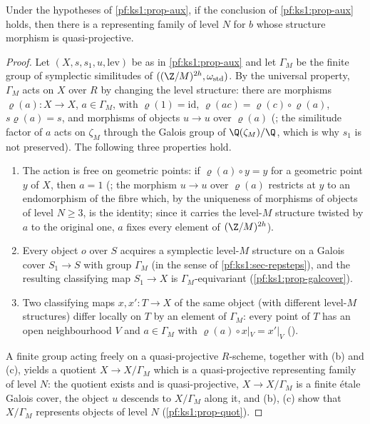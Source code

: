 \begin{proposition}\label{pf:ks1:prop-descent}
Under the hypotheses of \cref{pf:ks1:prop-aux}, if the conclusion of \cref{pf:ks1:prop-aux} holds, then
there is a representing family of level $N$ for $b$ whose structure morphism is quasi-projective.
\end{proposition}

\begin{proof}
Let $(X,s,s_1,u,\mathrm{lev})$ be as in \cref{pf:ks1:prop-aux} and let $\Gamma_M$ be the finite group of
symplectic similitudes of $((\Z/M)^{2h},\omega_{\mathrm{std}})$. By the universal property, $\Gamma_M$ acts on
$X$ over $R$ by changing the level structure: there are morphisms $\varrho(a):X\to X$, $a\in\Gamma_M$, with
$\varrho(1)=\mathrm{id}$, $\varrho(ac)=\varrho(c)\circ\varrho(a)$, $s\varrho(a)=s$, and morphisms of objects $u\to u$ over
$\varrho(a)$ (; the similitude
factor of $a$ acts on $\zeta_M$ through the Galois group of $\Q(\zeta_M)/\Q$, which is why $s_1$ is not
preserved). The following three properties hold.
\begin{enumerate}[label=(\alph*)]
\item The action is free on geometric points: if $\varrho(a)\circ y=y$ for a geometric point $y$ of $X$, then $a=1$
  (; the morphism $u\to u$ over
  $\varrho(a)$ restricts at $y$ to an endomorphism of the fibre which, by the uniqueness of morphisms of objects of
  level $N\ge3$, is the identity; since it carries the level-$M$ structure twisted by $a$ to the original one, $a$
  fixes every element of $(\Z/M)^{2h}$).
\item Every object $o$ over $S$ acquires a symplectic level-$M$ structure on a Galois cover $S_1\to S$ with group
  $\Gamma_M$ (in the sense of \cref{pf:ks1:sec-repsteps}), and the resulting classifying map $S_1\to X$ is
  $\Gamma_M$-equivariant (\cref{pf:ks1:prop-galcover}).
\item Two classifying maps $x,x':T\to X$ of the same object (with different level-$M$ structures) differ
  locally on $T$ by an element of $\Gamma_M$: every point of $T$ has an open neighbourhood $V$ and $a\in\Gamma_M$
  with $\varrho(a)\circ x|_V=x'|_V$ ().
\end{enumerate}
A finite group acting freely on a quasi-projective $R$-scheme, together with (b) and (c), yields a quotient
$X\to X/\Gamma_M$ which is a quasi-projective representing family of level $N$: the quotient exists and is
quasi-projective, $X\to X/\Gamma_M$ is a finite \'etale Galois cover, the object $u$ descends to $X/\Gamma_M$ along
it, and (b), (c) show that $X/\Gamma_M$ represents objects of level $N$
(\cref{pf:ks1:prop-quot}).
\end{proof}

